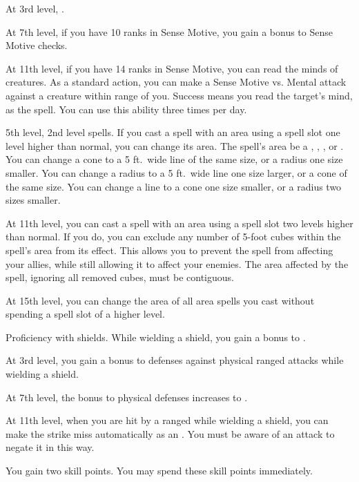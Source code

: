     At 3rd level, \tdash.

    At 7th level, if you have 10 ranks in Sense Motive, you gain a  bonus to Sense Motive checks.

    At 11th level, if you have 14 ranks in Sense Motive, you can read the minds of creatures.
    As a standard action, you can make a Sense Motive vs. Mental attack against a creature within \rngmed range of you.
    Success means you read the target's mind, as the  spell.
    You can use this ability three times per day.

    \featpre 5th level, 2nd level spells.
    \featben If you cast a spell with an area using a spell slot one level higher than normal, you can change its area.
    The spell's area be a \areasmall, \areamed, \arealarge, or \areahuge {}.
    You can change a cone to a 5 ft.\ wide line of the same size, or a radius one size smaller.
    You can change a radius to a 5 ft.\ wide line one size larger, or a cone of the same size.
    You can change a line to a cone one size smaller, or a radius two sizes smaller.

    At 11th level, you can cast a spell with an area using a spell slot two levels higher than normal.
    If you do, you can exclude any number of 5-foot cubes within the spell's area from its effect.
    This allows you to prevent the spell from affecting your allies, while still allowing it to affect your enemies.
    The area affected by the spell, ignoring all removed cubes, must be contiguous.

    At 15th level, you can change the area of all area spells you cast without spending a spell slot of a higher level.

    \featpre Proficiency with shields.
    \featben While wielding a shield, you gain a  bonus to .

    At 3rd level, you gain a  bonus to defenses against physical ranged attacks while wielding a shield.

    At 7th level, the bonus to physical defenses increases to .

    At 11th level, when you are hit by a ranged  while wielding a shield, you can make the strike miss automatically as an .
    You must be aware of an attack to negate it in this way.

    \featben You gain two skill points.
    You may spend these skill points immediately.

